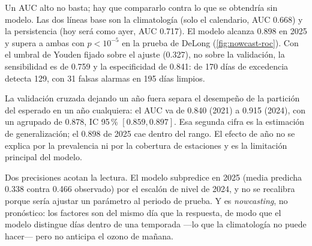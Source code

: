 Un AUC alto no basta; hay que compararlo contra lo que se obtendría sin
modelo. Las dos líneas base son la climatología (solo el calendario, AUC
0.668) y la persistencia (hoy será como ayer, AUC 0.717). El modelo alcanza
0.898 en 2025 y supera a ambas con $p<10^{-5}$ en la prueba de DeLong
(\cref{fig:nowcast-roc}). Con el umbral de Youden fijado sobre el ajuste
(0.327), no sobre la validación, la sensibilidad es de 0.759 y la
especificidad de 0.841: de 170 días de excedencia detecta 129, con 31 falsas
alarmas en 195 días limpios.

La validación cruzada dejando un año fuera separa el desempeño de la
partición del esperado en un año cualquiera: el AUC va de 0.840 (2021) a
0.915 (2024), con un agrupado de 0.878, IC 95\,\% $[0.859, 0.897]$. Esa
segunda cifra es la estimación de generalización; el 0.898 de 2025 cae
dentro del rango. El efecto de año no se explica por la prevalencia ni por la
cobertura de estaciones y es la limitación principal del modelo.

Dos precisiones acotan la lectura. El modelo subpredice en 2025 (media
predicha 0.338 contra 0.466 observado) por el escalón de nivel de 2024, y no
se recalibra porque sería ajustar un parámetro al periodo de prueba. Y es
\emph{nowcasting}, no pronóstico: los factores son del mismo día que la
respuesta, de modo que el modelo distingue días dentro de una temporada ---lo
que la climatología no puede hacer--- pero no anticipa el ozono de mañana.
